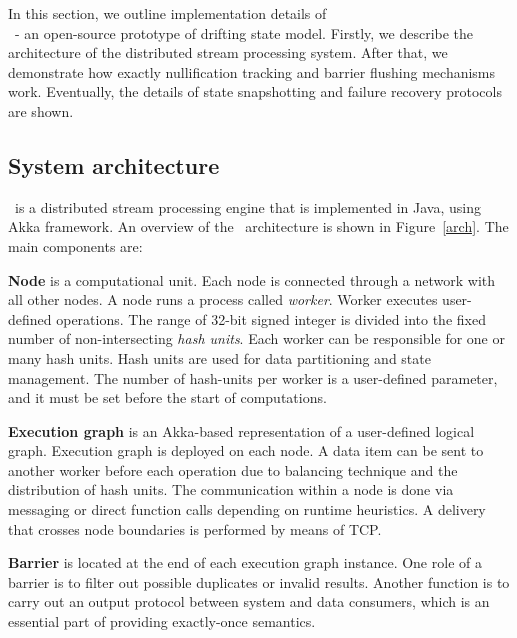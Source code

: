 
\label {fs-consistency-section}

In this section, we outline implementation details of \\ 
\FlameStream\ - an open-source prototype of drifting state model. Firstly, we describe the architecture of the distributed stream processing system. After that, we demonstrate how exactly nullification tracking and barrier flushing mechanisms work. Eventually, the details of state snapshotting and failure recovery protocols are shown. 

\subsection{System architecture}


\FlameStream\ is a distributed stream processing engine that is implemented in Java, using Akka framework. An overview of the \FlameStream\ architecture is shown in Figure~\ref{arch}. The main components are:

{\bf Node} is a computational unit. Each node is connected through a network with all other nodes. A node runs a process called {\it worker}. Worker executes user-defined operations. The range of 32-bit signed integer is divided into the fixed number of non-intersecting {\it hash units}. Each worker can be responsible for one or many hash units. Hash units are used for data partitioning and state management. The number of hash-units per worker is a user-defined parameter, and it must be set before the start of computations. 

{\bf Execution graph} is an Akka-based representation of a user-defined logical graph. Execution graph is deployed on each node. A data item can be sent to another worker before each operation due to balancing technique and the distribution of hash units. The communication within a node is done via messaging or direct function calls depending on runtime heuristics. A delivery that crosses node boundaries is performed by means of TCP.

{\bf Barrier} is located at the end of each execution graph instance. One role of a barrier is to filter out possible duplicates or invalid results. Another function is to carry out an output protocol between system and data consumers, which is an essential part of providing exactly-once semantics.

